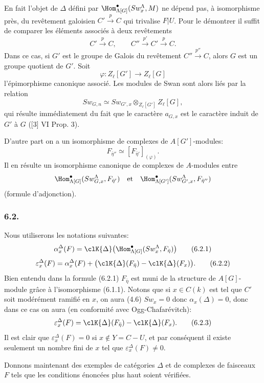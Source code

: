 En fait l'objet de $\Delta$ défini par $\Hom^\bullet_{\Lambda[G]}(Sw_x^\Lambda,M)$ ne dépend pas, à isomorphisme près, du revêtement galoisien $C'\xrightarrow{p}C$ qui trivalise $F|U$. Pour le démontrer il suffit de comparer les éléments associés à deux revêtements
\[
C'\xrightarrow{p}C,\qquad C''\xrightarrow{p'}C'\xrightarrow{p}C.
\]
Dans ce cas, si $G'$ est le groupe de Galois du revêtement $C''\xrightarrow{p''}C$, alors $G$ est un groupe quotient de $G'$. Soit
\[
\varphi:Z_\ell[G']\longrightarrow Z_\ell[G]
\]
l'épimorphisme canonique associé. Les modules de Swan sont alors liés par la relation
\[
Sw_{G,n}\simeq Sw_{G',x}\otimes_{Z_\ell[G']}Z_\ell[G],
\]
qui résulte immédiatement du
fait que le caractère $a_{G,x}$ est le caractère induit de $G'$ à $G$ ([3] VI Prop. 3).

D'autre part on a un isomorphisme de complexes de $A[G']$-modules:
\[
F_{\bar\eta''}\simeq [F_{\bar\eta'}]_{(\varphi)}.
\]
Il en résulte un isomorphisme canonique de complexes de $A$-modules entre
\[
\Hom^\bullet_{\Lambda[G]}(Sw_{G,x}^\Lambda,F_{\bar\eta'})
\quad\text{et}\quad
\Hom^\bullet_{\Lambda[G']}(Sw_{G',x}^\Lambda,F_{\bar\eta''})
\]
(formule d'adjonction).

\subsubsection*{6.2.}

Nous utiliserons les notations suivantes:
\[
\alpha_x^\Delta(F)
=
\clK{\Delta}\bigl(\Hom^\bullet_{\Lambda[G]}(Sw_x^\Lambda,F_{\bar\eta})\bigr)
\tag{6.2.1}
\]
\[
\varepsilon_x^\Delta(F)
=
\alpha_x^\Delta(F)+
\bigl(\clK{\Delta}(F_{\bar\eta})-\clK{\Delta}(F_x)\bigr).
\tag{6.2.2}
\]
Bien entendu dans la formule (6.2.1) $F_{\bar\eta}$ est muni de la structure de $A[G]$-module grâce à l'isomorphisme (6.1.1). Notons que si $x\in C(k)$ est tel que $C'$ soit modérément ramifié en $x$, on aura (4.6) $Sw_x=0$ donc $\alpha_x(\Delta)=0$, donc dans ce cas on aura (en conformité avec Ogg-Chafarévitch):
\[
\varepsilon_x^\Delta(F)=\clK{\Delta}(F_{\bar\eta})-\clK{\Delta}(F_x).
\tag{6.2.3}
\]
Il est clair que $\varepsilon_x^\Delta(F)=0$ si $x\notin Y=C-U$, et par conséquent il existe seulement un nombre fini de $x$ tel que $\varepsilon_x^\Delta(F)\ne0$.

Donnons maintenant des exemples de catégories $\Delta$ et de complexes de faisceaux $F$ tels que les conditions énoncées plus haut soient vérifiées.

